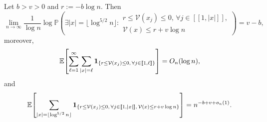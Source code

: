\begin{lemma}[Lemma 3.10]
Let $b>v>0$ and $r:=-b\log n$. Then
\[
    \lim_{n\to\infty}
    \frac{1}{\log n}
    \log\mathbb P\!\left(
        \exists |x|=\lfloor\log^{5/2}n\rfloor:
        \begin{aligned}
            r\le\mathcal V(x_j)\le 0,\,
            \forall j\in[\![1,|x|]\!],\\
            \mathcal V(x)\le r+v\log n
        \end{aligned}
    \right)
    =
    v-b,
\]
moreover,
\[
    \mathbb E\!\left[
        \sum_{\ell=1}^\infty
        \sum_{|x|=\ell}
        {\bf 1}_{
            \{
                r\le\mathcal V(x_j)\le 0,\,
                \forall j\in[\![1,\ell]\!]
            \}
        }
    \right]
    =
    O_n(\log n),
\]
and
\[
    \mathbb E\!\left[
        \sum_{|x|=\lfloor\log^{5/2}n\rfloor}
        {\bf 1}_{
            \{
                r\le\mathcal V(x_j)\le 0,\,
                \forall j\in[\![1,|x|]\!],\,
                \mathcal V(x)\le r+v\log n
            \}
        }
    \right]
    =
    n^{-b+v+o_n(1)}.
\]
\end{lemma}
